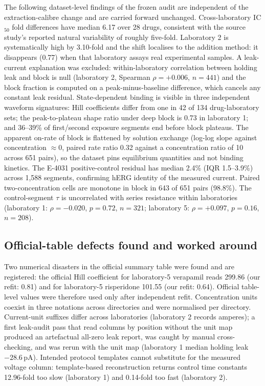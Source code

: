 \documentclass[11pt,a4paper]{article}
\begin{document}
The following dataset-level findings of the frozen audit are independent of
the extraction-calibre change and are carried forward unchanged.
Cross-laboratory IC$_{50}$ fold differences have median 6.17 over 28 drugs,
consistent with the source study's reported natural variability of roughly
five-fold. Laboratory 2 is systematically high by 3.10-fold and the shift
localises to the addition method: it disappears (0.77) when that laboratory
assays real experimental samples. A leak-current explanation was excluded:
within-laboratory correlation between holding leak and block is null
(laboratory 2, Spearman $\rho=+0.006$, $n=441$) and the block fraction is
computed on a peak-minus-baseline difference, which cancels any constant leak
residual. State-dependent binding is visible in three independent waveform
signatures: Hill coefficients differ from one in 42 of 134 drug-laboratory
sets; the peak-to-plateau shape ratio under deep block is 0.73 in laboratory
1; and 36--39\% of first/second exposure segments end before block plateaus.
The apparent on-rate of block is flattened by solution exchange (log-log slope
against concentration $\approx0$, paired rate ratio 0.32 against a
concentration ratio of 10 across 651 pairs), so the dataset pins equilibrium
quantities and not binding kinetics. The E-4031 positive-control residual has
median 2.4\% (IQR 1.5--3.9\%) across 1,588 segments, confirming hERG identity
of the measured current. Paired two-concentration cells are monotone in block
in 643 of 651 pairs (98.8\%). The control-segment $\tau$ is uncorrelated with
series resistance within laboratories (laboratory 1: $\rho=-0.020$, $p=0.72$,
$n=321$; laboratory 5: $\rho=+0.097$, $p=0.16$, $n=208$).

\subsection{Official-table defects found and worked around}

Two numerical disasters in the official summary table were found and are
registered: the official Hill coefficient for laboratory-5 verapamil reads
299.86 (our refit: 0.81) and for laboratory-5 risperidone 101.55 (our refit:
0.64). Official table-level values were therefore used only after independent
refit. Concentration units coexist in three notations across directories and
were normalised per directory. Current-unit suffixes differ across
laboratories (laboratory 2 records amperes); a first leak-audit pass that read
columns by position without the unit map produced an artefactual all-zero leak
report, was caught by manual cross-checking, and was rerun with the unit map
(laboratory 1 median holding leak $-28.6$\,pA). Intended protocol templates
cannot substitute for the measured voltage column: template-based
reconstruction returns control time constants 12.96-fold too slow (laboratory
1) and 0.14-fold too fast (laboratory 2).
\end{document}
